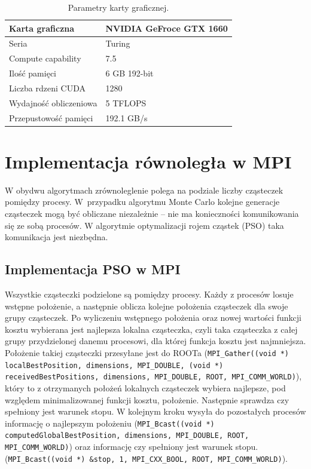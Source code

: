 \documentclass[11pt, a4paper, oneside]{article}
\begin{document}
\begin{table}[h]
\centering
\begin{tabular}{|l|l|}
\hline
Karta graficzna          & NVIDIA GeFroce GTX 1660 \\ \hline
Seria     & Turing                              \\ \hline
Compute capability    & 7.5                             \\ \hline
Ilość pamięci   & 6 GB 192-bit                                 \\ \hline
Liczba rdzeni CUDA & 1280      \\ \hline
Wydajność obliczeniowa			  & 5 TFLOPS						        \\ \hline
Przepustowość pamięci			  & 192.1 GB/s						        \\ \hline
\end{tabular}
\caption{Parametry karty graficznej.}
\label{tab:par_gpu}
\end{table}


\section{Implementacja równoległa w MPI}

W obydwu algorytmach zrównoleglenie polega na podziale liczby cząsteczek pomiędzy procesy. W~przypadku algorytmu Monte Carlo kolejne generacje cząsteczek mogą być obliczane niezależnie -- nie ma konieczności komunikowania się ze sobą procesów. W algorytmie optymalizacji rojem cząstek (PSO) taka komunikacja jest niezbędna. 


\subsection{Implementacja PSO w MPI}

Wszystkie cząsteczki podzielone są pomiędzy procesy. Każdy z procesów losuje wstępne położenie, a następnie oblicza kolejne położenia cząsteczek dla swoje grupy cząsteczek. Po wyliczeniu wstępnego położenia oraz nowej wartości funkcji kosztu wybierana jest najlepsza lokalna cząsteczka, czyli taka cząsteczka z całej grupy przydzielonej danemu procesowi, dla której funkcja kosztu jest najmniejsza. Położenie takiej cząsteczki przesyłane jest do ROOTa (\lstinline[style=mycpp]{MPI_Gather((void *) localBestPosition, dimensions, MPI_DOUBLE, (void *) receivedBestPositions, dimensions, MPI_DOUBLE, ROOT, MPI_COMM_WORLD)}), który to z otrzymanych położeń lokalnych cząsteczek wybiera najlepsze, pod względem minimalizowanej funkcji kosztu, położenie. Następnie sprawdza czy spełniony jest warunek stopu. W kolejnym kroku wysyła do pozostałych procesów informację o najlepszym położeniu (\lstinline[style=mycpp]{MPI_Bcast((void *) computedGlobalBestPosition, dimensions, MPI_DOUBLE, ROOT, MPI_COMM_WORLD)}) oraz informację czy spełniony jest warunek stopu. (\lstinline[style=mycpp]{MPI_Bcast((void *) &stop, 1, MPI_CXX_BOOL, ROOT, MPI_COMM_WORLD)}).
\end{document}
